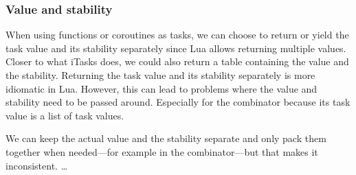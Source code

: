 \subsubsection{Value and stability}
When using functions or coroutines as tasks, we can choose to return or yield the task value and its stability separately since Lua allows returning multiple values. Closer to what iTasks does, we could also return a table containing the value and the stability. Returning the task value and its stability separately is more idiomatic in Lua. However, this can lead to problems where the value and stability need to be passed around. Especially for the  combinator because its task value is a list of task values.

We can keep the actual value and the stability separate and only pack them together when needed---for example in the  combinator---but that makes it inconsistent. \dots {}
